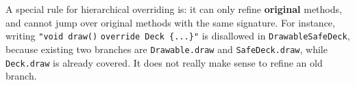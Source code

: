 A special rule for hierarchical overriding is: it can only refine \textbf{original} methods, and cannot jump over original methods with the same signature. For instance, writing \lstinline|"void draw()| \lstinline|override Deck {...}"| is disallowed in \lstinline|DrawableSafeDeck|, because existing two branches are \lstinline|Drawable.draw| and \lstinline|SafeDeck.draw|, while \lstinline|Deck.draw| is already covered. It does not really make sense to refine an old branch.

